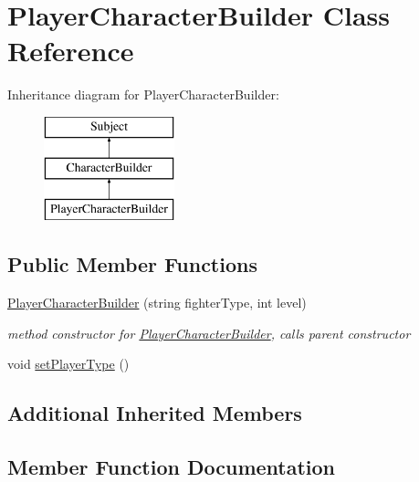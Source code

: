 \hypertarget{class_player_character_builder}{}\section{Player\+Character\+Builder Class Reference}
\label{class_player_character_builder}
Inheritance diagram for Player\+Character\+Builder\+:\begin{figure}[H]
\begin{center}
\leavevmode
\includegraphics[height=3.000000cm]{class_player_character_builder}
\end{center}
\end{figure}
\subsection*{Public Member Functions}
\begin{DoxyCompactItemize}
\item 
\hypertarget{class_player_character_builder_a0912c1328fae4491666f92c454bd81ab}{}\label{class_player_character_builder_a0912c1328fae4491666f92c454bd81ab} 
\hyperlink{class_player_character_builder_a0912c1328fae4491666f92c454bd81ab}{Player\+Character\+Builder} (string fighter\+Type, int level)
\begin{DoxyCompactList}\small\item\em method constructor for \hyperlink{class_player_character_builder}{Player\+Character\+Builder}, calls parent constructor \end{DoxyCompactList}\item 
void \hyperlink{class_player_character_builder_adade4adf1a457842cc4699c8017dc641}{set\+Player\+Type} ()
\end{DoxyCompactItemize}
\subsection*{Additional Inherited Members}


\subsection{Member Function Documentation}
\hypertarget{class_player_character_builder_adade4adf1a457842cc4699c8017dc641}{}\label{class_player_character_builder_adade4adf1a457842cc4699c8017dc641} 
